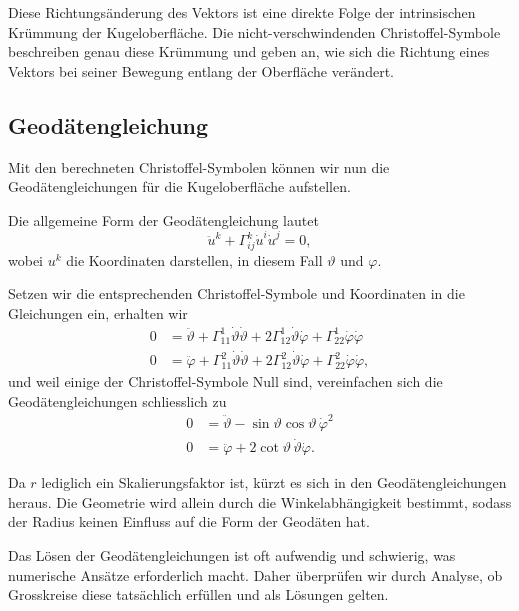 Diese Richtungsänderung des Vektors ist eine direkte Folge der intrinsischen Krümmung der Kugeloberfläche.
Die nicht-verschwindenden Christoffel-Symbole beschreiben genau diese Krümmung und geben an, wie sich die Richtung eines Vektors bei seiner Bewegung entlang der Oberfläche verändert.

\subsection{Geodätengleichung}
Mit den berechneten Christoffel-Symbolen können wir nun die Geodätengleichungen für die Kugeloberfläche aufstellen.

Die allgemeine Form der Geodätengleichung lautet
\begin{equation}
	\ddot{u}^k + \Gamma^k_{i\!j} \dot{u}^i \dot{u}^j = 0,
\end{equation}
wobei $u^k$ die Koordinaten darstellen, in diesem Fall $\vartheta$ und $\varphi$.

Setzen wir die entsprechenden Christoffel-Symbole und Koordinaten in die Gleichungen ein, erhalten wir
\begin{equation}
	\begin{aligned} 
		0 &= \ddot{\vartheta} + \Gamma^1_{11} \dot{\vartheta} \dot{\vartheta} + 2\Gamma^1_{12} \dot{\vartheta}\dot{\varphi} + \Gamma^1_{22} \dot{\varphi} \dot{\varphi} \\
		0 &= \ddot{\varphi} + \Gamma^2_{11} \dot{\vartheta} \dot{\vartheta} + 2\Gamma^2_{12} \dot{\vartheta}\dot{\varphi} + \Gamma^2_{22} \dot{\varphi} \dot{\varphi},
	\end{aligned}
\end{equation}
und weil einige der Christoffel-Symbole Null sind, vereinfachen sich die Geodätengleichungen schliesslich zu
\begin{align}
	0 &= \ddot{\vartheta} - \sin\vartheta \cos\vartheta \, \dot{\varphi}^2 \\
	0 &= \ddot{\varphi} + 2 \cot\vartheta \, \dot{\vartheta} \dot{\varphi}.
\end{align}

Da $r$ lediglich ein Skalierungsfaktor ist, kürzt es sich in den Geodätengleichungen heraus. 
Die Geometrie wird allein durch die Winkelabhängigkeit bestimmt, sodass der Radius keinen Einfluss auf die Form der Geodäten hat.

Das Lösen der Geodätengleichungen ist oft aufwendig und schwierig, was numerische Ansätze erforderlich macht. 
Daher überprüfen wir durch Analyse, ob Grosskreise diese tatsächlich erfüllen und als Lösungen gelten.

